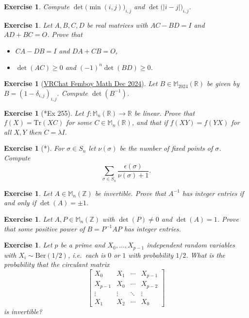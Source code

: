 \documentclass[12pt]{article}
\renewcommand{\Tr}{\mathrm{Tr}}
\theoremstyle{breakplain}
\theoremstyle{breakdef}
\newtheorem{ex}[subsubsection]{Exercise}
\theoremstyle{remark}
\begin{document}
\begin{ex}
    Compute $\det\big(\min(i,j)\big)_{i,j}$ and $\det\big(|i-j|\big)_{i,j}$.
\end{ex}
\begin{ex}
    Let $ A,B,C,D $ be real matrices with $ AC-BD=I $ and $ AD+BC=O $. Prove that
    \begin{itemize}
        \item $ CA-DB=I $ and $ DA+CB=O $,
        \item $ \det(AC)\geq 0 $ and $ (-1)^n\det(BD)\geq 0 $.
    \end{itemize}
\end{ex}
\begin{ex}[\href{https://cdn.artofproblemsolving.com/attachments/6/b/7602596bee912ae3a5085a745ca110424c39d2.pdf}{VRChat Femboy Math Dec 2024}]
    Let $ B\in\mathbb{M}_{2024}(\mathbb{R}) $ be given by $B=(1-\delta_{i,j})_{i,j}$. Compute $\det(B^{-1})$.
\end{ex}
\begin{ex}[\cite{GA17}*{Ex 255}]
    Let $f:\mathbb{M}_{n}(\mathbb{R}) \to \mathbb{R}$ be linear. Prove that $f(X)=\Tr(XC)$ for some $C\in\mathbb{M}_n(\mathbb{R})$, and that if $f(XY)=f(YX)$ for all $X,Y$ then $C=\lambda I$.
\end{ex}
\begin{ex}[*]
    For $\sigma \in S_n$ let $\nu(\sigma)$ be the number of fixed points of $\sigma$. Compute
    \[\sum_{\sigma \in S_n}\frac{\epsilon(\sigma)}{\nu(\sigma)+1}.\]
\end{ex}
\begin{ex}
    Let $A\in \mathbb{M}_n(\mathbb{Z})$ be invertible. Prove that $A^{-1}$ has integer entries if and only if $\det(A)=\pm1$.
\end{ex}
\begin{ex}
    Let $A,P\in \mathbb{M}_n(\mathbb{Z})$ with $\det(P)\neq 0$ and $\det(A)=1$. Prove that some positive power of $B=P^{-1} A P$ has integer entries.
\end{ex}
\begin{ex}
    Let $p$ be a prime and $X_0,\ldots,X_{p-1}$ independent random variables with $X_i\sim \mathrm{Ber}(1/2)$, i.e.\ each is $0$ or $1$ with probability $1/2$. What is the probability that the circulant matrix
    \[\begin{bmatrix}
    X_0 & X_1 & \cdots & X_{p-1}\\
    X_{p-1} & X_0 & \cdots & X_{p-2}\\
    \vdots & \vdots & \ddots & \vdots \\
    X_1 & X_2 & \cdots & X_0
    \end{bmatrix}\]
    is invertible?
\end{ex}
\end{document}
